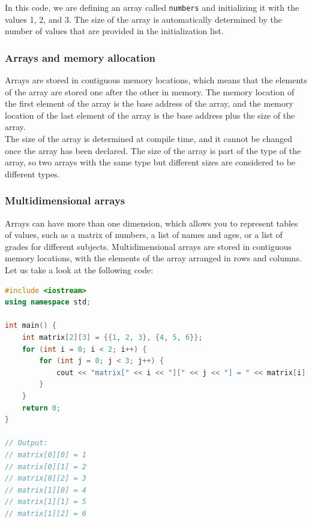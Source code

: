 In this code, we are defining an array called \texttt{numbers} and initializing it with the values 1, 2, and 3. The size of
the array is automatically determined by the number of values that are provided in the initialization list.\\

\subsubsection{Arrays and memory allocation}

Arrays are stored in contiguous memory locations, which means that the elements of the array are stored one after the other
in memory. The memory location of the first element of the array is the base address of the array, and the memory location of
the last element of the array is the base address plus the size of the array.\\

The size of the array is determined at compile time, and it cannot be changed once the array has been declared. The size of
the array is part of the type of the array, so two arrays with the same type but different sizes are considered to be different
types.\\

\subsubsection{Multidimensional arrays}

Arrays can have more than one dimension, which allows you to represent tables of values, such as a matrix of numbers, a list of
names and ages, or a list of grades for different subjects. Multidimensional arrays are stored in contiguous memory locations,
with the elements of the array arranged in rows and columns.\\

Let us take a look at the following code:

\begin{lstlisting}[language=C++]
#include <iostream>
using namespace std;

int main() {
    int matrix[2][3] = {{1, 2, 3}, {4, 5, 6}};
    for (int i = 0; i < 2; i++) {
        for (int j = 0; j < 3; j++) {
            cout << "matrix[" << i << "][" << j << "] = " << matrix[i][j] << endl;
        }
    }
    return 0;
}

// Output:
// matrix[0][0] = 1
// matrix[0][1] = 2
// matrix[0][2] = 3
// matrix[1][0] = 4
// matrix[1][1] = 5
// matrix[1][2] = 6
\end{lstlisting}

